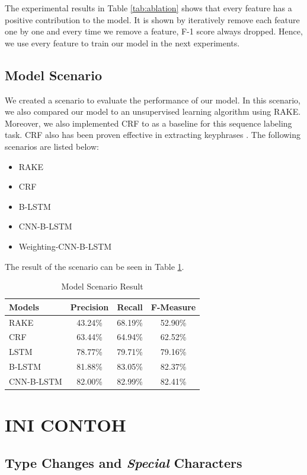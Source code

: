 The experimental results in Table \ref{tab:ablation} shows that every feature has a positive contribution to the model. It is shown by iteratively remove each feature one by one and every time we remove a feature, F-1 score always dropped. Hence, we use every feature to train our model in the next experiments.
\subsection{Model Scenario}
We created a scenario to evaluate the performance of our model. In this scenario, we also compared our model to an unsupervised learning algorithm using RAKE. Moreover, we also implemented CRF to as a baseline for this sequence labeling task. CRF also has been proven effective in extracting keyphrases \cite{cao2010automatically} \cite{zhang2008automatic}. The following scenarios are listed below:
\begin{itemize}
	\item RAKE
	\item CRF
	\item B-LSTM
	\item CNN-B-LSTM
	\item Weighting-CNN-B-LSTM
\end{itemize}
The result of the scenario can be seen in Table \ref{tab:model_scenario}.
\begin{table}
	\caption{Model Scenario Result}
	\label{tab:model_scenario}
	\begin{tabular}{lccc}
		\toprule
		Models&Precision&Recall&F-Measure\\
		\midrule
			RAKE & 43.24\% & 68.19\% & 52.90\% \\
			
			CRF & 63.44\% & 64.94\% & 62.52\% \\
			
			LSTM & 78.77\% & 79.71\% & 79.16\% \\
			
			B-LSTM & 81.88\% & 83.05\% & 82.37\% \\
			
			CNN-B-LSTM & 82.00\% & 82.99\% & 82.41\% \\
	
		\bottomrule
	\end{tabular}
\end{table}
\section{INI CONTOH}
\subsection{Type Changes and {\itshape Special} Characters}

